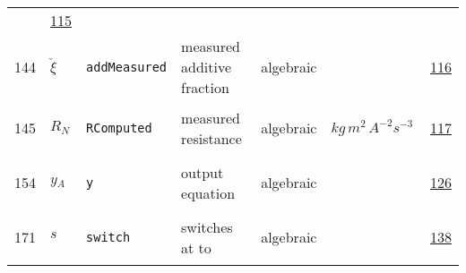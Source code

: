 \begin{longtable}{|p{1cm}|p{2.5cm}|p{4.5cm}|p{8cm}|p{3.0cm}|p{3cm}|p{1cm}|}
             &                 \hyperlink{"e:115"}{ 115 }
                 \\
            144
             & \hypertarget{"v:144"}{ $ {{\check{\xi}}}{_{}} $}
             & \verb|addMeasured|
             & measured additive fraction
             & \begin{lay}algebraic \end{lay}
             & $  $
             &                 \hyperlink{"e:116"}{ 116 }
                 \\
            145
             & \hypertarget{"v:145"}{ $ {R}{_{N}} $}
             & \verb|RComputed|
             & measured resistance 
             & \begin{lay}algebraic \end{lay}
             & $ kg \,m^{2} \,A^{-2} s^{-3} \, $
             &                 \hyperlink{"e:117"}{ 117 }
                 \\
            154
             & \hypertarget{"v:154"}{ $ {y}{_{A}} $}
             & \verb|y|
             & output equation
             & \begin{lay}algebraic \end{lay}
             & $  $
             &                 \hyperlink{"e:126"}{ 126 }
                 \\
            171
             & \hypertarget{"v:171"}{ $ {s}{_{}} $}
             & \verb|switch|
             & switches at to
             & \begin{lay}algebraic \end{lay}
             & $  $
             &                 \hyperlink{"e:138"}{ 138 }
                 \\
    \end{longtable}